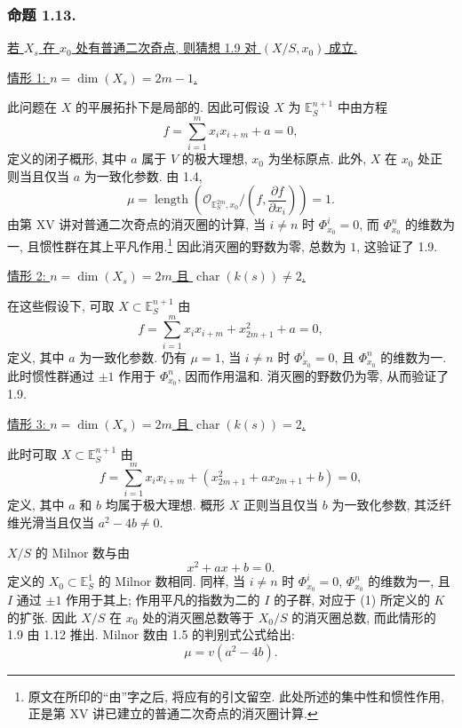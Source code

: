 \subsubsection*{命题 1.13.}
\underline{若 $X_s$ 在 $x_0$ 处有普通二次奇点, 则猜想 1.9 对 $(X/S,x_0)$ 成立.}

\medskip
\noindent\underline{情形 1: $n=\dim(X_s)=2m-1$.}

此问题在 $X$ 的平展拓扑下是局部的. 因此可假设 $X$ 为 $\mathbb E_S^{n+1}$ 中由方程
\[
f=\sum_{i=1}^{m}x_i x_{i+m}+a=0,
\]
定义的闭子概形, 其中 $a$ 属于 $V$ 的极大理想, $x_0$ 为坐标原点. 此外, $X$ 在 $x_0$ 处正则当且仅当 $a$ 为一致化参数. 由 1.4,
\[
\mu=\operatorname{length}\!\left(
\mathcal O_{\mathbb E_S^{2m},x_0}/
\left(f,\frac{\partial f}{\partial x_i}\right)\right)=1.
\]
由第 XV 讲对普通二次奇点的消灭圈的计算, 当 $i\ne n$ 时 $\Phi^i_{x_0}=0$, 而 $\Phi^n_{x_0}$ 的维数为一, 且惯性群在其上平凡作用.\footnote{原文在所印的“由”字之后, 将应有的引文留空. 此处所述的集中性和惯性作用, 正是第 XV 讲已建立的普通二次奇点的消灭圈计算.}
因此消灭圈的野数为零, 总数为 $1$, 这验证了 1.9.

\medskip
\noindent\underline{情形 2: $n=\dim(X_s)=2m$ 且 $\operatorname{char}(k(s))\ne2$.}

在这些假设下, 可取 $X\subset\mathbb E_S^{n+1}$ 由
\[
f=\sum_{i=1}^{m}x_i x_{i+m}+x_{2m+1}^2+a=0,
\]
定义, 其中 $a$ 为一致化参数. 仍有 $\mu=1$, 当 $i\ne n$ 时 $\Phi^i_{x_0}=0$, 且 $\Phi^n_{x_0}$ 的维数为一. 此时惯性群通过 $\pm1$ 作用于 $\Phi^n_{x_0}$, 因而作用温和. 消灭圈的野数仍为零, 从而验证了 1.9.

\medskip
\noindent\underline{情形 3: $n=\dim(X_s)=2m$ 且 $\operatorname{char}(k(s))=2$.}

此时可取 $X\subset\mathbb E_S^{n+1}$ 由
\[
f=\sum_{i=1}^{m}x_i x_{i+m}
 +(x_{2m+1}^2+a x_{2m+1}+b)=0,
\]
定义, 其中 $a$ 和 $b$ 均属于极大理想. 概形 $X$ 正则当且仅当 $b$ 为一致化参数, 其泛纤维光滑当且仅当 $a^2-4b\ne0$.

$X/S$ 的 Milnor 数与由
\begin{equation}\tag{1}
x^2+a x+b=0.
\end{equation}
定义的 $X_0\subset\mathbb E_S^1$ 的 Milnor 数相同. 同样, 当 $i\ne n$ 时 $\Phi^i_{x_0}=0$, $\Phi^n_{x_0}$ 的维数为一, 且 $I$ 通过 $\pm1$ 作用于其上; 作用平凡的指数为二的 $I$ 的子群, 对应于 (1) 所定义的 $K$ 的扩张. 因此 $X/S$ 在 $x_0$ 处的消灭圈总数等于 $X_0/S$ 的消灭圈总数, 而此情形的 1.9 由 1.12 推出. Milnor 数由 1.5 的判别式公式给出:
\begin{equation}\tag{1.13.1}
\mu=v(a^2-4b).
\end{equation}
